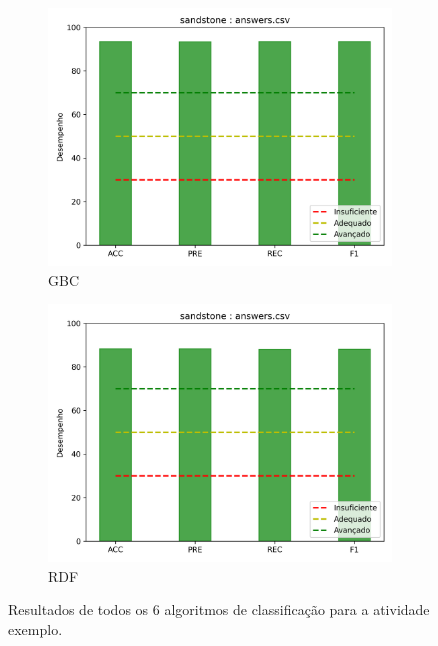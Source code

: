 \begin{figure}[!h]
\begin{subfigure}{0.4\textwidth}
 \includegraphics[width=\textwidth]{figuras/exemplo/sandstone-evalGBC.png}
 \caption{GBC}
\end{subfigure}
\hfill
\begin{subfigure}{0.4\textwidth}
 \centering
 \includegraphics[width=\textwidth]{figuras/exemplo/sandstone-evalRDF.png}
 \caption{RDF}
\end{subfigure}
\caption{Resultados de todos os 6 algoritmos de classificação para a atividade exemplo.}
\label{fig-exemplo-clf}
\end{figure}

